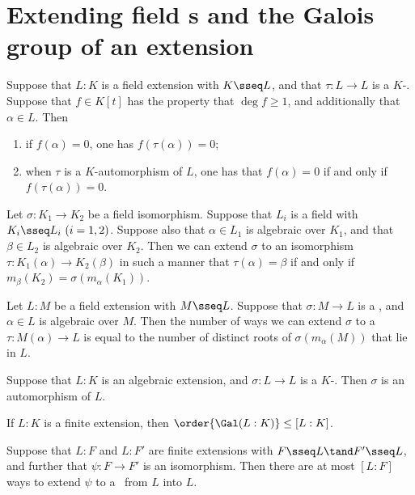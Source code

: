 \documentclass{article}
\begin{document}
\section{Extending field \homo s and the Galois group of an extension}
  \begin{tproposition}
    Suppose that $L:K$ is a field extension with $K\sseq L$, and that $\tau:L\to L$ is a $K$-\homo. Suppose that $f\in K[t]$ has the property that $\deg f\geq 1$, and additionally that $\alpha\in L$. Then
    \begin{enumerate}[label=(\roman*)]
      \item if $f(\alpha)=0$, one has $f(\tau(\alpha))=0$;
      \item when $\tau$ is a $K$-automorphism of $L$, one has that $f(\alpha)=0$ if and only if $f(\tau(\alpha))=0$.
    \end{enumerate}
  \end{tproposition}

  \begin{ttheorem}
    Let $\sigma:K_1\to K_2$ be a field isomorphism. Suppose that $L_i$ is a field with $K_i\sseq L_i\ (i=1,2)$. Suppose also that $\alpha\in L_1$ is algebraic over $K_1$, and that $\beta\in L_2$ is algebraic over $K_2$. Then we can extend $\sigma$ to an isomorphism $\tau:K_1(\alpha)\to K_2(\beta)$ in such a manner that $\tau(\alpha)=\beta$ if and only if $m_\beta(K_2)=\sigma(m_\alpha(K_1))$.
  \end{ttheorem}

  \begin{tcorollary}
    Let $L:M$ be a field extension with $M\sseq L$. Suppose that $\sigma:M\to L$ is a \homo, and $\alpha\in L$ is algebraic over $M$. Then the number of ways we can extend $\sigma$ to a \homo~$\tau:M(\alpha)\to L$ is equal to the number of distinct roots of $\sigma(m_\alpha(M))$ that lie in $L$.
  \end{tcorollary}

  \begin{ttheorem}
    Suppose that $L:K$ is an algebraic extension, and $\sigma:L\to L$ is a $K$-\homo. Then $\sigma$ is an automorphism of $L$.
  \end{ttheorem}

  \begin{ttheorem}
    If $L:K$ is a finite extension, then $\order{\Gal(L:K)}\leq [L:K]$.
  \end{ttheorem}

  \begin{tcorollary}
    Suppose that $L:F$ and $L:F'$ are finite extensions with $F\sseq L\tand F'\sseq L$, and further that $\psi:F\to F'$ is an isomorphism. Then there are at most $[L:F]$ ways to extend $\psi$ to a \homo~from $L$ into $L$.
  \end{tcorollary}
\end{document}
